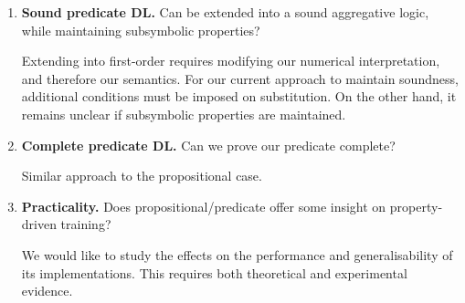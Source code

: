 \begin{enumerate}
    \item \textbf{Sound predicate DL.} Can \OL{} be extended into a sound aggregative logic, while maintaining subsymbolic properties?

    Extending into first-order requires modifying our numerical interpretation, and therefore our semantics. For our current approach to maintain soundness, additional conditions must be imposed on substitution. On the other hand, it remains unclear if subsymbolic properties are maintained. 
    
    \item \textbf{Complete predicate DL.} Can we prove our predicate \OL{} complete?
    
    Similar approach to the propositional case. 
    
    \item \textbf{Practicality.} Does propositional/predicate \OL{} offer some insight on property-driven training?

    We would like to study the effects \OL{} on the performance and generalisability \citep{jakubovitz2019generalization} of its implementations. This requires both theoretical and experimental evidence. 
    
\end{enumerate}
